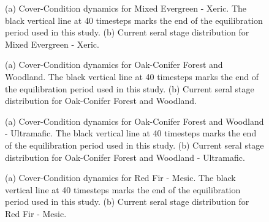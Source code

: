 \begin{figure}[!htbp]
  \centering
  \caption{(a) Cover-Condition dynamics for Mixed Evergreen - Xeric. The black vertical line at 40 timesteps marks the end of the equilibration period used in this study. (b) Current seral stage distribution for Mixed Evergreen - Xeric.} 
  \label{fig:covcond_megx}
\end{figure}

\begin{figure}[!htbp]
  \centering
  \caption{(a) Cover-Condition dynamics for Oak-Conifer Forest and Woodland. The black vertical line at 40 timesteps marks the end of the equilibration period used in this study. (b) Current seral stage distribution for Oak-Conifer Forest and Woodland.} 
  \label{fig:covcond_ocfw}
\end{figure}

\begin{figure}[!htbp]
  \centering
  \caption{(a) Cover-Condition dynamics for Oak-Conifer Forest and Woodland - Ultramafic. The black vertical line at 40 timesteps marks the end of the equilibration period used in this study. (b) Current seral stage distribution for Oak-Conifer Forest and Woodland - Ultramafic.} 
  \label{fig:covcond_ocfwu}
\end{figure}

\begin{figure}[!htbp]
  \centering
  \caption{(a) Cover-Condition dynamics for Red Fir - Mesic. The black vertical line at 40 timesteps marks the end of the equilibration period used in this study. (b) Current seral stage distribution for Red Fir - Mesic.} 
  \label{fig:covcond_rfrm}
\end{figure}

